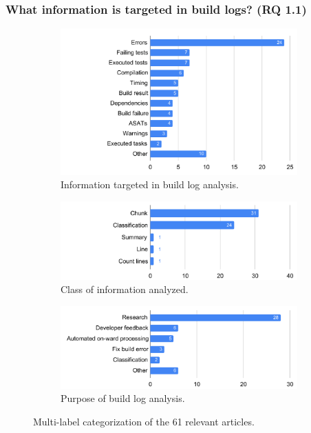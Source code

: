 \subsubsection{What information is targeted in build logs? (RQ 1.1)}
\label{sec:rq11}
\begin{figure}
\centering
\begin{subfigure}[t]{\columnwidth}
		\centering
		\includegraphics[width=\columnwidth,
		clip]{img/lit-sur/info_target.pdf}
		\caption{Information targeted in build log analysis.}
		\label{fig:litsur:info_target}

\end{subfigure}\hspace{\fill}
\begin{subfigure}[t]{\columnwidth}
		\centering
				\includegraphics[width=\columnwidth,
				clip]{img/lit-sur/kind.pdf}
		\caption{Class of information analyzed.}
		\label{fig:litsur:kind}

\end{subfigure}
\begin{subfigure}[t]{\columnwidth}
		\centering
				\includegraphics[width=\columnwidth,
				clip]{img/lit-sur/use.pdf}
		\caption{Purpose of build log analysis.}
		\label{fig:litsur:use}

\end{subfigure}

\caption{Multi-label categorization of the 61 relevant articles.}
\label{fig:litsur_r}
\end{figure}

